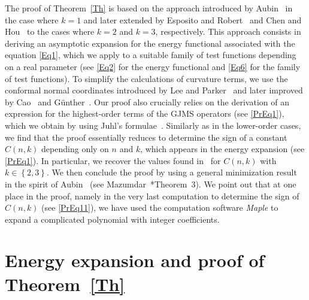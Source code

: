 \documentclass[reqno]{amsart}
\numberwithin{equation}{section}
\newcommand{\<}{\left<}
\renewcommand{\>}{\right>}
\renewcommand{\[}{\left[}
\renewcommand{\]}{\right]}
\renewcommand{\(}{\left(}
\renewcommand{\)}{\right)}
\begin{document}
\smallskip
The proof of Theorem~\ref{Th} is based on the approach introduced by Aubin~\cite{Aub} in the case where $k=1$ and later extended by Esposito and Robert~\cite{EspRob} and Chen and Hou~\cite{ChenHou} to the cases where $k=2$ and $k=3$, respectively. This approach consists in deriving an asymptotic expansion for the energy functional associated with the equation \eqref{Eq1}, which we apply to a suitable family of test functions depending on a real parameter (see \eqref{Eq2} for the energy functional and \eqref{Eq6} for the family of test functions). To simplify the calculations of curvature terms, we use the conformal normal coordinates introduced by Lee and Parker~\cite{LeePar} and later improved by Cao~\cite{Cao} and G\"{u}nther~\cite{Gun}. Our proof also crucially relies on the derivation of an expression for the highest-order terms of the GJMS operators (see \eqref{PrEq1}), which we obtain by using Juhl's formulae~\cite{Juhl}. Similarly as in the lower-order cases, we find that the proof essentially reduces to determine the sign of a constant $C\(n,k\)$ depending only on $n$ and $k$, which appears in the energy expansion (see \eqref{PrEq1}). In particular, we recover the values found in~\cites{ChenHou,EspRob} for $C\(n,k\)$ with $k\in\left\{2,3\right\}$. We then conclude the proof by using a general minimization result in the spirit of Aubin~\cite{Aub} (see Mazumdar~\cite{Maz}*{Theorem~3}). We point out that at one place in the proof, namely in the very last computation to determine the sign of $C\(n,k\)$ (see \eqref{PrEq11}), we have used the computation software {\it Maple} to expand a complicated polynomial with integer coefficients.

\section{Energy expansion and proof of Theorem~\ref{Th}}\label{Sec2}
\end{document}
